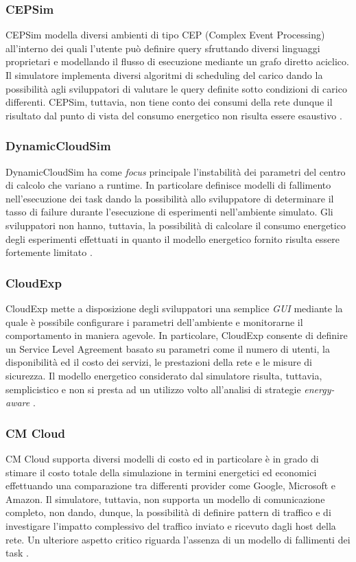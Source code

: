 {\subsubsection*{CEPSim}
CEPSim \cite{higashino2015cepsim} modella diversi ambienti di tipo CEP (Complex Event Processing) \cite{luckham1998complex} all'interno dei quali l'utente può definire query sfruttando diversi linguaggi proprietari e modellando il flusso di esecuzione mediante un grafo diretto aciclico. Il simulatore implementa diversi algoritmi di scheduling del carico dando la possibilità agli sviluppatori di valutare le query definite sotto condizioni di carico differenti. CEPSim, tuttavia, non tiene conto dei consumi della rete dunque il risultato dal punto di vista del consumo energetico non risulta essere esaustivo \cite{mansouri2020cloud}. 
\subsubsection*{DynamicCloudSim}
DynamicCloudSim \cite{bux2013dynamiccloudsim} ha come \emph{focus} principale l'instabilità dei parametri del centro di calcolo che variano a runtime. In particolare definisce modelli di fallimento nell'esecuzione dei task dando la possibilità allo sviluppatore di determinare il tasso di failure durante l'esecuzione di esperimenti nell'ambiente simulato. Gli sviluppatori non hanno, tuttavia, la possibilità di calcolare il consumo energetico degli esperimenti effettuati in quanto il modello energetico fornito risulta essere fortemente limitato \cite{mansouri2020cloud}.
\subsubsection*{CloudExp}
CloudExp \cite{jararweh2014cloudexp} mette a disposizione degli sviluppatori una semplice \emph{GUI} mediante la quale è possibile configurare i parametri dell'ambiente e monitorarne il comportamento in maniera agevole. In particolare, CloudExp consente di definire un Service Level Agreement basato su parametri come il numero di utenti, la disponibilità ed il costo dei servizi, le prestazioni della rete e le misure di sicurezza. Il modello energetico considerato dal simulatore risulta, tuttavia, semplicistico e non si presta ad un utilizzo volto all'analisi di strategie \emph{energy-aware} \cite{mansouri2020cloud}. 
\subsubsection*{CM Cloud}
CM Cloud \cite{alves2016cm} supporta diversi modelli di costo ed in particolare è in grado di stimare il costo totale della simulazione in termini energetici ed economici effettuando una comparazione tra differenti provider come Google, Microsoft e Amazon. Il simulatore, tuttavia, non supporta un modello di comunicazione completo, non dando, dunque, la possibilità di definire pattern di traffico e di investigare l'impatto complessivo del traffico inviato e ricevuto dagli host della rete. Un ulteriore aspetto critico riguarda l'assenza di un modello di fallimenti dei task \cite{mansouri2020cloud}.  
}
